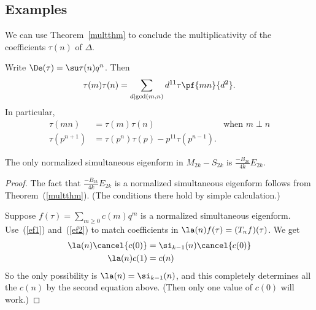 \subsection{Examples}
We can use Theorem~\ref{multthm} to conclude the multiplicativity of the coefficients $\tau(n)$ of $\Delta$.
\begin{cor}
Write $\De(\tau)=\su \tau(n)q^n$. Then
\[
\tau(m)\tau(n)=\sum_{d\mid \gcd(m,n)} d^{11} \tau\pf{mn}{d^2}.
\]
In particular,
\begin{align*}
\tau(mn)&=\tau(m)\tau(n)&\text{when }m\perp n\\
\tau(p^{n+1})&=\tau(p^n)\tau(p)-p^{11}\tau(p^{n-1}).
\end{align*}
\end{cor}
\begin{thm}
The only normalized simultaneous eigenform in $M_{2k}-S_{2k}$ is $\frac{-B_{2k}}{4k}E_{2k}$.
\end{thm}
\begin{proof}
The fact that $\frac{-B_{2k}}{4k}E_{2k}$ is a normalized simultaneous eigenform follows from Theorem~(\ref{multthm}). (The conditions there hold by simple calculation.)

Suppose $f(\tau)=\sum_{m\ge 0} c(m)q^m$ is a normalized simultaneous eigenform. 
Use~(\ref{ef1}) and~(\ref{ef2}) to match coefficients in $\la(n)f(\tau)=(T_nf)(\tau)$. We get 
\begin{align*}
\la(n)\cancel{c(0)}&=\si_{k-1}(n)\cancel{c(0)}\\%
\la(n)c(1)&=c(n)%
\end{align*}
So the only possibility is $\la(n)=\si_{k-1}(n)$, and this completely determines all the $c(n)$ by the second equation above. (Then only one value of $c(0)$ will work.)
\end{proof}
